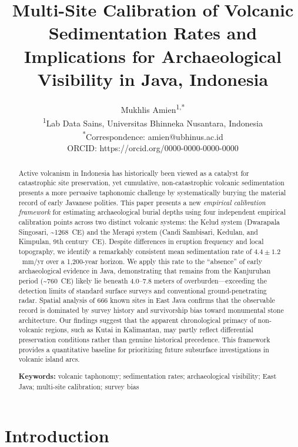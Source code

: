 \documentclass[12pt,a4paper]{article}
\title{Multi-Site Calibration of Volcanic Sedimentation Rates and Implications for Archaeological Visibility in Java, Indonesia}
\author{
  Mukhlis Amien\textsuperscript{1,*}\\[4pt]
  \small \textsuperscript{1}Lab Data Sains, Universitas Bhinneka Nusantara, Indonesia\\
  \small \textsuperscript{*}Correspondence: amien@ubhinus.ac.id\\
  \small ORCID: https://orcid.org/0000-0000-0000-0000 %
}
\date{}
\begin{document}
\maketitle

\begin{abstract}
Active volcanism in Indonesia has historically been viewed as a catalyst for catastrophic site preservation, yet cumulative, non-catastrophic volcanic sedimentation presents a more pervasive taphonomic challenge by systematically burying the material record of early Javanese polities. This paper presents a new \textit{empirical calibration framework} for estimating archaeological burial depths using four independent empirical calibration points across two distinct volcanic systems: the Kelud system (Dwarapala Singosari, \textasciitilde1268~CE) and the Merapi system (Candi Sambisari, Kedulan, and Kimpulan, 9th century~CE). Despite differences in eruption frequency and local topography, we identify a remarkably consistent mean sedimentation rate of $4.4 \pm 1.2$~mm/yr over a 1,200-year horizon. We apply this rate to the ``absence'' of early archaeological evidence in Java, demonstrating that remains from the Kanjuruhan period (\textasciitilde760~CE) likely lie beneath 4.0--7.8 meters of overburden---exceeding the detection limits of standard surface surveys and conventional ground-penetrating radar. Spatial analysis of 666 known sites in East Java confirms that the observable record is dominated by survey history and survivorship bias toward monumental stone architecture. Our findings suggest that the apparent chronological primacy of non-volcanic regions, such as Kutai in Kalimantan, may partly reflect differential preservation conditions rather than genuine historical precedence. This framework provides a quantitative baseline for prioritizing future subsurface investigations in volcanic island arcs.

\medskip
\noindent\textbf{Keywords:} volcanic taphonomy; sedimentation rates; archaeological visibility; East Java; multi-site calibration; survey bias
\end{abstract}

\section{Introduction}
\end{document}
